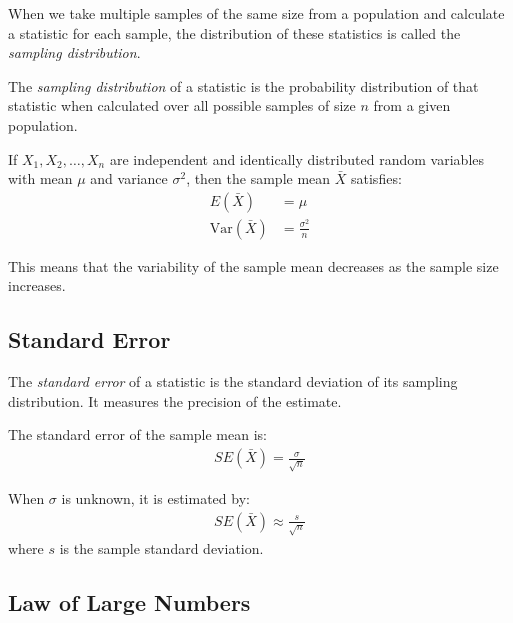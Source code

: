 When we take multiple samples of the same size from a population and calculate a statistic for each sample, the distribution of these statistics is called the \emph{sampling distribution}.

\begin{definicion}
	\label{def:5.1.2}
	The \emph{sampling distribution} of a statistic is the probability distribution of that statistic when calculated over all possible samples of size $n$ from a given population.
\end{definicion}

\begin{ejemplo}
	\label{exmp:5.1.2}
	If $X_1, X_2, \ldots, X_n$ are independent and identically distributed random variables with mean $\mu$ and variance $\sigma^2$, then the sample mean $\bar{X}$ satisfies:
	\begin{align}
		E(\bar{X}) &= \mu \\
		\text{Var}(\bar{X}) &= \frac{\sigma^2}{n}
	\end{align}

	This means that the variability of the sample mean decreases as the sample size increases.
\end{ejemplo}

\subsection*{Standard Error}

The \emph{standard error} of a statistic is the standard deviation of its sampling distribution. It measures the precision of the estimate.

\begin{definicion}
	\label{def:5.1.3}
	The standard error of the sample mean is:
	\begin{align}
		SE(\bar{X}) = \frac{\sigma}{\sqrt{n}}
	\end{align}

	When $\sigma$ is unknown, it is estimated by:
	\begin{align}
		SE(\bar{X}) \approx \frac{s}{\sqrt{n}}
	\end{align}
	where $s$ is the sample standard deviation.
\end{definicion}

\subsection*{Law of Large Numbers}


